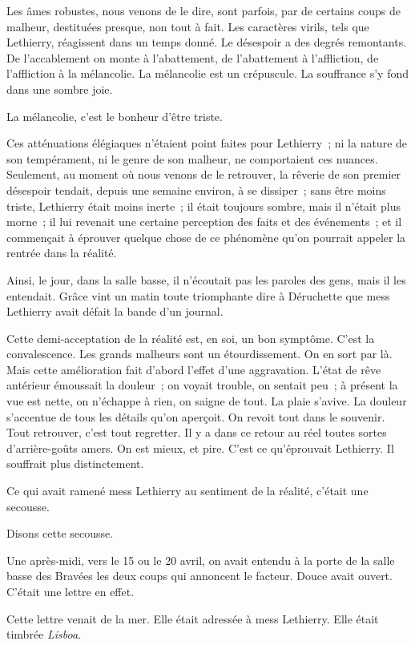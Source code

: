 \documentclass[french,twoside]{book} %
\begin{document}
Les âmes robustes, nous venons de le dire, sont parfois, par de certains coups de malheur, destituées presque, non tout à fait. Les caractères virils, tels que Lethierry, réagissent dans un temps donné. Le désespoir a des degrés remontants. De l’accablement on monte à l’abattement, de l’abattement à l’affliction, de l’affliction à la mélancolie. La mélancolie est un crépuscule. La souffrance s’y fond dans une sombre joie.\par
La mélancolie, c’est le bonheur d’être triste.\par
Ces atténuations élégiaques n’étaient point faites pour Lethierry ; ni la nature de son tempérament, ni le genre de son malheur, ne comportaient ces nuances. Seulement, au moment où nous venons de le retrouver, la rêverie de son premier désespoir tendait, depuis une semaine environ, à se dissiper ; sans être moins triste, Lethierry était moins inerte ; il était toujours  sombre, mais il n’était plus morne ; il lui revenait une certaine perception des faits et des événements ; et il commençait à éprouver quelque chose de ce phénomène qu’on pourrait appeler la rentrée dans la réalité.\par
Ainsi, le jour, dans la salle basse, il n’écoutait pas les paroles des gens, mais il les entendait. Grâce vint un matin toute triomphante dire à Déruchette que mess Lethierry avait défait la bande d’un journal.\par
Cette demi-acceptation de la réalité est, en soi, un bon symptôme. C’est la convalescence. Les grands malheurs sont un étourdissement. On en sort par là. Mais cette amélioration fait d’abord l’effet d’une aggravation. L’état de rêve antérieur émoussait la douleur ; on voyait trouble, on sentait peu ; à présent la vue est nette, on n’échappe à rien, on saigne de tout. La plaie s’avive. La douleur s’accentue de tous les détails qu’on aperçoit. On revoit tout dans le souvenir. Tout retrouver, c’est tout regretter. Il y a dans ce retour au réel toutes sortes d’arrière-goûts amers. On est mieux, et pire. C’est ce qu’éprouvait Lethierry. Il souffrait plus distinctement.\par
Ce qui avait ramené mess Lethierry au sentiment de la réalité, c’était une secousse.\par
Disons cette secousse.\par
Une après-midi, vers le 15 ou le 20 avril, on avait entendu à la porte de la salle basse des Bravées les deux coups qui annoncent le facteur. Douce avait ouvert. C’était une lettre en effet.\par
Cette lettre venait de la mer. Elle était adressée à mess Lethierry. Elle était timbrée \emph{Lisboa}.\par
\end{document}
